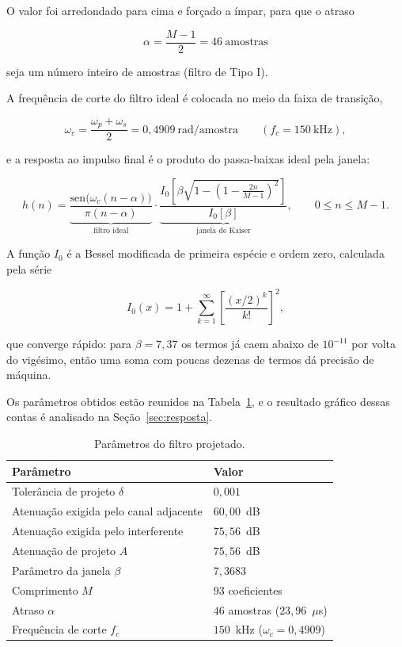 O valor foi arredondado para cima e forçado a ímpar, para que o atraso

\begin{equation}
\alpha = \frac{M-1}{2} = 46 \ \mathrm{amostras}
\end{equation}

seja um número inteiro de amostras (filtro de Tipo I).

A frequência de corte do filtro ideal é colocada no meio da faixa de transição,

\begin{equation}
\omega_c = \frac{\omega_p + \omega_s}{2} = 0{,}4909 \ \mathrm{rad/amostra} \qquad (f_c = 150 \ \mathrm{kHz}),
\end{equation}

e a resposta ao impulso final é o produto do passa-baixas ideal pela janela:

\begin{equation}
h(n) = \underbrace{\frac{\mathrm{sen}\big(\omega_c(n-\alpha)\big)}{\pi(n-\alpha)}}_{\text{filtro ideal}}
\cdot
\underbrace{\frac{I_0\!\left[\beta\sqrt{1 - \left(1 - \frac{2n}{M-1}\right)^2}\right]}{I_0[\beta]}}_{\text{janela de Kaiser}},
\qquad 0 \le n \le M-1 .
\label{eq:hn}
\end{equation}

A função $I_0$ é a Bessel modificada de primeira espécie e ordem zero, calculada pela série

\begin{equation}
I_0(x) = 1 + \sum_{k=1}^{\infty}\left[\frac{(x/2)^k}{k!}\right]^2 ,
\end{equation}

que converge rápido: para $\beta = 7{,}37$ os termos já caem abaixo de $10^{-11}$ por volta do vigésimo, então uma soma com poucas dezenas de termos dá precisão de máquina.

Os parâmetros obtidos estão reunidos na Tabela~\ref{tab:parametros}, e o resultado gráfico dessas contas é analisado na Seção~\ref{sec:resposta}.

\begin{table}[htb]
\centering
\caption{Parâmetros do filtro projetado.}
\label{tab:parametros}
\begin{tabular}{ll}
\hline
\textbf{Parâmetro} & \textbf{Valor} \\
\hline
Tolerância de projeto $\delta$ & $0{,}001$ \\
Atenuação exigida pelo canal adjacente & $60{,}00$~dB \\
Atenuação exigida pelo interferente & $75{,}56$~dB \\
Atenuação de projeto $A$ & $75{,}56$~dB \\
Parâmetro da janela $\beta$ & $7{,}3683$ \\
Comprimento $M$ & $93$ coeficientes \\
Atraso $\alpha$ & $46$ amostras ($23{,}96$~$\mu$s) \\
Frequência de corte $f_c$ & $150$~kHz ($\omega_c = 0{,}4909$) \\
\hline
\end{tabular}
\end{table}
